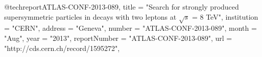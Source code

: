 @techreport{ATLAS-CONF-2013-089,
      title         = "{Search for strongly produced supersymmetric particles in
                       decays with two leptons at $\sqrt{s}$ = 8 TeV}",
      institution   = "CERN",
      address       = "Geneva",
      number        = "ATLAS-CONF-2013-089",
      month         = "Aug",
      year          = "2013",
      reportNumber  = "ATLAS-CONF-2013-089",
      url           = "http://cds.cern.ch/record/1595272",
}

